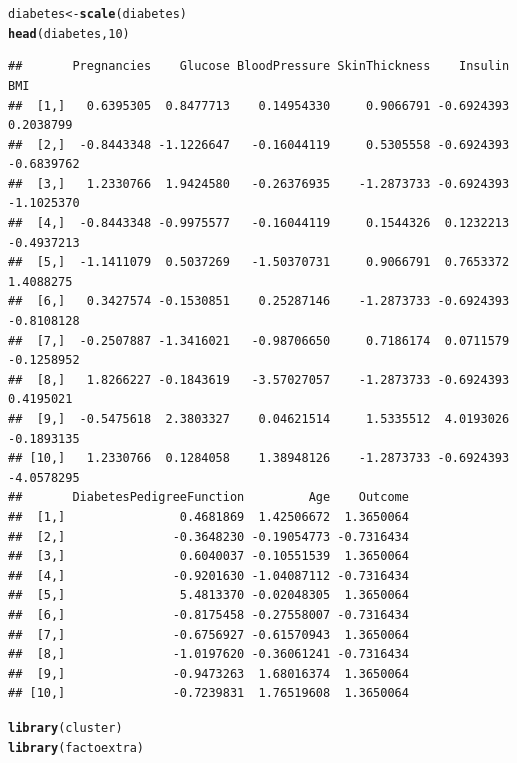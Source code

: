 \documentclass{article}\usepackage[]{graphicx}\usepackage[]{color}
\makeatletter
\newcommand{\hlnum}[1]{\textcolor[rgb]{0.686,0.059,0.569}{#1}}%
\newcommand{\hlstd}[1]{\textcolor[rgb]{0.345,0.345,0.345}{#1}}%
\newcommand{\hlkwb}[1]{\textcolor[rgb]{0.69,0.353,0.396}{#1}}%
\newcommand{\hlkwd}[1]{\textcolor[rgb]{0.737,0.353,0.396}{\textbf{#1}}}%
\newenvironment{kframe}{%
 \def\at@end@of@kframe{}%
 \ifinner\ifhmode%
  \def\at@end@of@kframe{\end{minipage}}%
  \begin{minipage}{\columnwidth}%
 \fi\fi%
 \def\FrameCommand##1{\hskip\@totalleftmargin \hskip-\fboxsep
 \colorbox{shadecolor}{##1}\hskip-\fboxsep
     \hskip-\linewidth \hskip-\@totalleftmargin \hskip\columnwidth}%
 \MakeFramed {\advance\hsize-\width
   \@totalleftmargin\z@ \linewidth\hsize
   \@setminipage}}%
 {\par\unskip\endMakeFramed%
 \at@end@of@kframe}
\newenvironment{knitrout}{}{} %
\makeatother
\begin{document}
\begin{knitrout}
\color{fgcolor}\begin{kframe}
\begin{alltt}
\hlstd{diabetes}\hlkwb{<-}\hlkwd{scale}\hlstd{(diabetes)}
\hlkwd{head}\hlstd{(diabetes,}\hlnum{10}\hlstd{)}
\end{alltt}
\begin{verbatim}
##       Pregnancies    Glucose BloodPressure SkinThickness    Insulin        BMI
##  [1,]   0.6395305  0.8477713    0.14954330     0.9066791 -0.6924393  0.2038799
##  [2,]  -0.8443348 -1.1226647   -0.16044119     0.5305558 -0.6924393 -0.6839762
##  [3,]   1.2330766  1.9424580   -0.26376935    -1.2873733 -0.6924393 -1.1025370
##  [4,]  -0.8443348 -0.9975577   -0.16044119     0.1544326  0.1232213 -0.4937213
##  [5,]  -1.1411079  0.5037269   -1.50370731     0.9066791  0.7653372  1.4088275
##  [6,]   0.3427574 -0.1530851    0.25287146    -1.2873733 -0.6924393 -0.8108128
##  [7,]  -0.2507887 -1.3416021   -0.98706650     0.7186174  0.0711579 -0.1258952
##  [8,]   1.8266227 -0.1843619   -3.57027057    -1.2873733 -0.6924393  0.4195021
##  [9,]  -0.5475618  2.3803327    0.04621514     1.5335512  4.0193026 -0.1893135
## [10,]   1.2330766  0.1284058    1.38948126    -1.2873733 -0.6924393 -4.0578295
##       DiabetesPedigreeFunction         Age    Outcome
##  [1,]                0.4681869  1.42506672  1.3650064
##  [2,]               -0.3648230 -0.19054773 -0.7316434
##  [3,]                0.6040037 -0.10551539  1.3650064
##  [4,]               -0.9201630 -1.04087112 -0.7316434
##  [5,]                5.4813370 -0.02048305  1.3650064
##  [6,]               -0.8175458 -0.27558007 -0.7316434
##  [7,]               -0.6756927 -0.61570943  1.3650064
##  [8,]               -1.0197620 -0.36061241 -0.7316434
##  [9,]               -0.9473263  1.68016374  1.3650064
## [10,]               -0.7239831  1.76519608  1.3650064
\end{verbatim}
\end{kframe}
\end{knitrout}

\begin{knitrout}
\color{fgcolor}\begin{kframe}
\begin{alltt}
\hlkwd{library}\hlstd{(cluster)}
\hlkwd{library}\hlstd{(factoextra)}
\end{alltt}


{\ttfamily\noindent\itshape\color{messagecolor}{\#\# Loading required package: ggplot2}}

{\ttfamily\noindent\itshape\color{messagecolor}{\#\# Welcome! Want to learn more? See two factoextra-related books at https://goo.gl/ve3WBa}}\end{kframe}
\end{knitrout}
\end{document}
